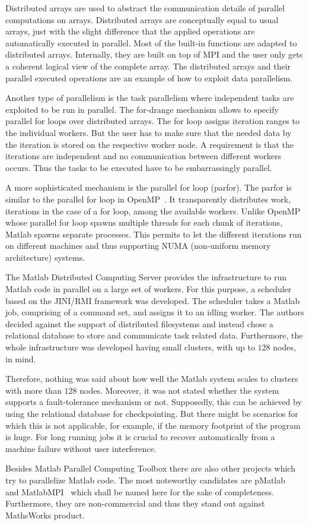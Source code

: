 Distributed arrays are used to abstract the communication details of parallel computations on arrays.
Distributed arrays are conceptually equal to usual arrays, just with the slight difference that the applied operations are automatically executed in parallel.
Most of the built-in functions are adapted to distributed arrays.
Internally, they are built on top of MPI and the user only gets a coherent logical view of the complete array.
The distributed arrays and their parallel executed operations are an example of how to exploit data parallelism.

Another type of parallelism is the task parallelism where independent tasks are exploited to be run in parallel.
The for-drange mechanism allows to specify parallel for loops over distributed arrays.
The for loop assigns iteration ranges to the individual workers.
But the user has to make sure that the needed data by the iteration is stored on the respective worker node.
A requirement is that the iterations are independent and no communication between different workers occurs.
Thus the tasks to be executed have to be embarrassingly parallel.

A more sophisticated mechanism is the parallel for loop (parfor).
The parfor is similar to the parallel for loop in OpenMP~\cite{dagum:csei1998a}.
It transparently distributes work, iterations in the case of a for loop, among the available workers.
Unlike OpenMP whose parallel for loop spawns multiple threads for each chunk of iterations, Matlab spawns separate processes.
This permits to let the different iterations run on different machines and thus supporting NUMA (non-uniform memory architecture) systems.

The Matlab Distributed Computing Server provides the infrastructure to run Matlab code in parallel on a large set of workers.
For this purpose, a scheduler based on the JINI/RMI framework was developed.
The scheduler takes a Matlab job, comprising of a command set, and assigns it to an idling worker.
The authors decided against the support of distributed filesystems and instead chose a relational database to store and communicate task related data.
Furthermore, the whole infrastructure was developed having small clusters, with up to $128$ nodes, in mind.

Therefore, nothing was said about how well the Matlab system scales to clusters with more than $128$ nodes.
Moreover, it was not stated whether the system supports a fault-tolerance mechanism or not.
Supposedly, this can be achieved by using the relational database for checkpointing.
But there might be scenarios for which this is not applicable, for example, if the memory footprint of the program is huge.
For long running jobs it is crucial to recover automatically from a machine failure without user interference.

Besides Matlab Parallel Computing Toolbox there are also other projects which try to parallelize Matlab code.
The most noteworthy candidates are pMatlab~\cite{bliss:ijhpca2007a} and MatlabMPI~\cite{kepner:jpdc2004a} which shall be named here for the sake of completeness.
Furthermore, they are non-commercial and thus they stand out against MathsWorks product.
